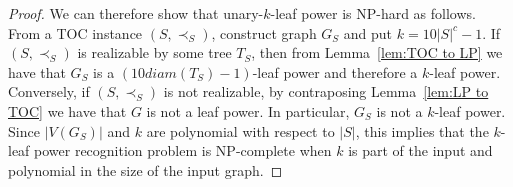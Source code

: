 \documentclass[11pt, letter]{article}
\theoremstyle{remark}
\DeclareMathOperator{\diam}{diam}
\begin{document}
\begin{proof}
    We can therefore show that unary-$k$-leaf power is NP-hard as follows.  From a TOC instance $(S, \prec_S)$, construct graph $G_S$ and put $k = 10 |S|^c - 1$. 
    If $(S, \prec_S)$ is realizable by some tree $T_S$, then from Lemma~\ref{lem:TOC to LP} we have that $G_S$ is a $(10 diam(T_S) - 1)$-leaf power and therefore a $k$-leaf power. 
    Conversely, if $(S, \prec_S)$ is not realizable, by contraposing Lemma~\ref{lem:LP to TOC} we have that $G$ is not a leaf power.  In particular, $G_S$ is not a $k$-leaf power. 
    Since $|V(G_S)|$ and $k$ are polynomial with respect to $|S|$, this implies that the $k$-leaf power recognition problem is NP-complete when $k$ is part of the input and polynomial in the size of the input graph.
\end{proof}
    
    
    
\end{document}
